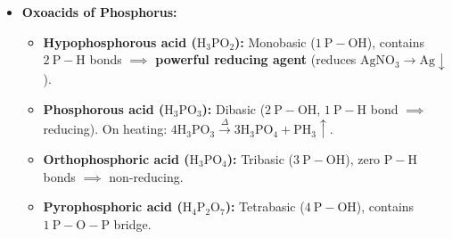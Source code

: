 \documentclass[10pt,twoside,openright]{book}
\begin{document}
\begin{itemize}
\begin{align}
    \text{Zn (dil. } \mathrm{HNO_3}\text{)} &: 4\mathrm{Zn} + 10\mathrm{HNO_3} \longrightarrow 4\mathrm{Zn(NO_3)_2} + \mathbf{\mathrm{N_2O\uparrow}} + 5\mathrm{H_2O} \\
    \text{Zn (conc. } \mathrm{HNO_3}\text{)} &: \mathrm{Zn} + 4\mathrm{HNO_3} \longrightarrow \mathrm{Zn(NO_3)_2} + \mathbf{2\mathrm{NO_2\uparrow}} + 2\mathrm{H_2O}
  \end{align}
  Passive metals ($\mathrm{Fe, Cr, Al}$) do not dissolve in concentrated $\mathrm{HNO_3}$ due to formation of an impervious surface oxide film.
  \item \textbf{Oxoacids of Phosphorus:}
  \begin{itemize}
    \item \textbf{Hypophosphorous acid ($\mathrm{H_3PO_2}$):} Monobasic ($1\ \mathrm{P-OH}$), contains $2\ \mathrm{P-H}$ bonds $\implies$ \textbf{powerful reducing agent} (reduces $\mathrm{AgNO_3 \to Ag\downarrow}$).
    \item \textbf{Phosphorous acid ($\mathrm{H_3PO_3}$):} Dibasic ($2\ \mathrm{P-OH}$, $1\ \mathrm{P-H}$ bond $\implies$ reducing). On heating: $4\mathrm{H_3PO_3} \xrightarrow{\Delta} 3\mathrm{H_3PO_4} + \mathrm{PH_3}\uparrow$.
    \item \textbf{Orthophosphoric acid ($\mathrm{H_3PO_4}$):} Tribasic ($3\ \mathrm{P-OH}$), zero $\mathrm{P-H}$ bonds $\implies$ non-reducing.
    \item \textbf{Pyrophosphoric acid ($\mathrm{H_4P_2O_7}$):} Tetrabasic ($4\ \mathrm{P-OH}$), contains $1\ \mathrm{P-O-P}$ bridge.
  \end{itemize}
\end{itemize}
\end{document}
